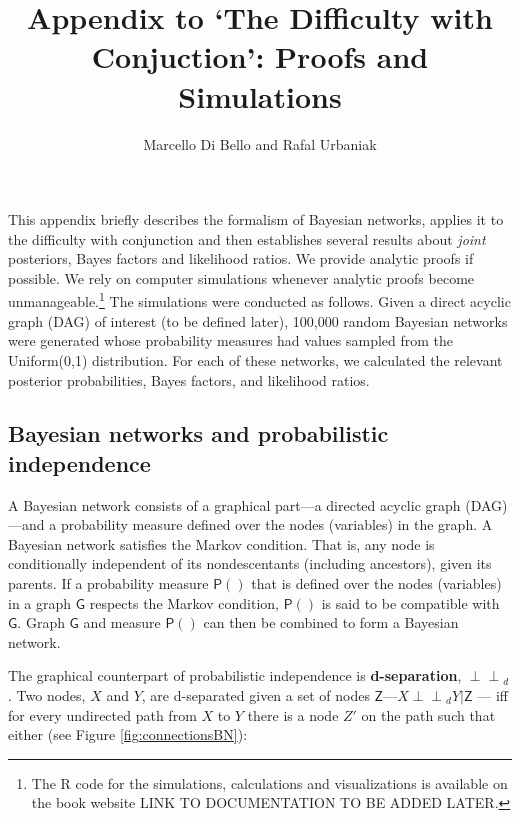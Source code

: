\documentclass[
  10pt,
  dvipsnames,enabledeprecatedfontcommands]{scrartcl}
\title{Appendix to `The Difficulty with Conjuction': Proofs and
Simulations}
\author{Marcello Di Bello and Rafal Urbaniak}
\date{}
\newcommand{\indep}{\!\perp \!\!\! \perp\!}
\newcommand{\pr}[1]{\ensuremath{\mathsf{P}(#1)}}
\begin{document}
\maketitle

This appendix briefly describes the formalism of Bayesian networks,
applies it to the difficulty with conjunction and then establishes
several results about \textit{joint} posteriors, Bayes factors and
likelihood ratios. We provide analytic proofs if possible. We rely on
computer simulations whenever analytic proofs become
unmanageable.\footnote{The R code for the simulations, calculations and
  visualizations is available on the book website LINK TO DOCUMENTATION
  TO BE ADDED LATER.} The simulations were conducted as follows. Given a
direct acyclic graph (DAG) of interest (to be defined later), 100,000
random Bayesian networks were generated whose probability measures had
values sampled from the \textsf{Uniform(0,1)} distribution. For each of
these networks, we calculated the relevant posterior probabilities,
Bayes factors, and likelihood ratios.

\hypertarget{bayesian-networks-and-probabilistic-independence}{%
\subsection*{Bayesian networks and probabilistic
independence}\label{bayesian-networks-and-probabilistic-independence}}

A Bayesian network consists of a graphical part---a directed acyclic
graph (DAG)---and a probability measure defined over the nodes
(variables) in the graph. A Bayesian network satisfies the Markov
condition. That is, any node is conditionally independent of its
nondescentants (including ancestors), given its parents. If a
probability measure \(\pr{}\) that is defined over the nodes (variables)
in a graph \(\mathsf{G}\) respects the Markov condition, \(\pr{}\) is
said to be compatible with \(\mathsf{G}\). Graph \(\mathsf{G}\) and
measure \(\pr{}\) can then be combined to form a Bayesian network.

The graphical counterpart of probabilistic independence is
\textbf{d-separation}, \(\indep_d\). Two nodes, \(X\) and \(Y\), are
d-separated given a set of nodes
\(\mathsf{Z}\)---\(X\indep_d Y \vert \mathsf{Z}\) --- iff for every
undirected path from \(X\) to \(Y\) there is a node \(Z'\) on the path
such that either (see Figure \ref{fig:connectionsBN}):
\end{document}
